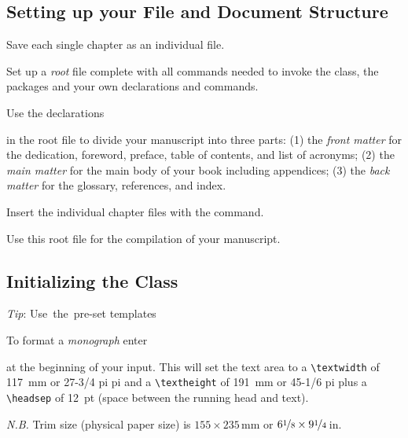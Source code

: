\documentclass[graybox]{svmono}
\begin{document}
\subsection{ Setting up your File and Document Structure}

Save each single chapter as an individual file.

Set up a {\it root} file complete with all commands needed to invoke the class, the packages and your own declarations and commands.

Use the declarations
\cprotect{}


in the root file to divide your manuscript into three parts: (1) the {\it front matter}
for the dedication, foreword, preface, table of contents, and list of acronyms; (2)
the {\it main matter} for the main body of your book including appendices; (3) the
{\it back matter} for the glossary, references, and index.

Insert the individual chapter files with the \verb|| command.

Use this root file for the compilation of your manuscript.


\subsection{Initializing the Class}

\hspace*{29pc}\hbox{{\it Tip}:}
\hspace*{29pc}\hbox{Use the pre-set}
\hspace*{29pc}\hbox{templates}


\vspace*{-4.5pc}

To format a {\it monograph} enter

\cprotect{}

at the beginning of your input. This will set the text area to a \verb|\textwidth| of 117~mm or 27-3/4 pi pi and a \verb|\textheight| of 191~mm or 45-1/6 pi plus a \verb|\headsep| of 12~pt (space between the running head and text).

{\it N.B.} Trim size (physical paper size) is $155 \times 235$\,mm or $6\nicefrac{1}{8} \times 9\nicefrac{1}{4}$\,in.
\end{document}
